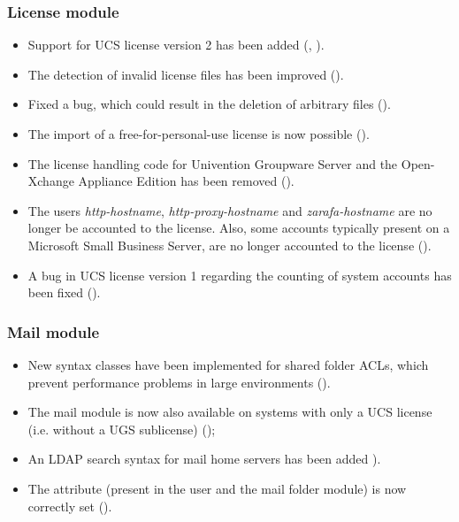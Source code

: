 \subsubsection{License module}
\begin{itemize}
\item Support for UCS license version 2 has been added
(, ).

\item The detection of invalid license files has been improved
  ().

\item Fixed a bug, which could result in the deletion of arbitrary
  files ().

\item The import of a free-for-personal-use license is now possible
  ().

\item The license handling code for Univention Groupware Server and
  the Open-Xchange Appliance Edition has been removed ().

\item The users \emph{http-hostname}, \emph{http-proxy-hostname} and
  \emph{zarafa-hostname} are no longer be accounted to the
  license. Also, some accounts typically present on a Microsoft Small
  Business Server, are no longer accounted to the license ().

\item A bug in UCS license version 1 regarding the counting of system
  accounts has been fixed ().
\end{itemize}


\subsubsection{Mail module}
\begin{itemize}
\item New syntax classes have been implemented for shared folder ACLs,
  which prevent performance problems in large environments
  ().
\item The mail module is now also available on systems with only a UCS
  license (i.e. without a UGS sublicense) ();
\item An LDAP search syntax for mail home servers has been added
  ).
\item The attribute  (present in the user
  and the mail folder module) is now correctly set ().


\end{itemize}


